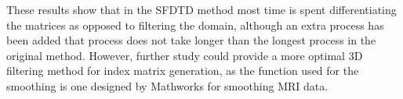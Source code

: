 These results show that in the SFDTD method most time is spent differentiating the matrices as opposed to filtering the domain, although an extra process has been added that process does not take longer than the longest process in the original method. However, further study could provide a more optimal 3D filtering method for index matrix generation, as the function used for the smoothing is one designed by Mathworks for smoothing MRI data.

